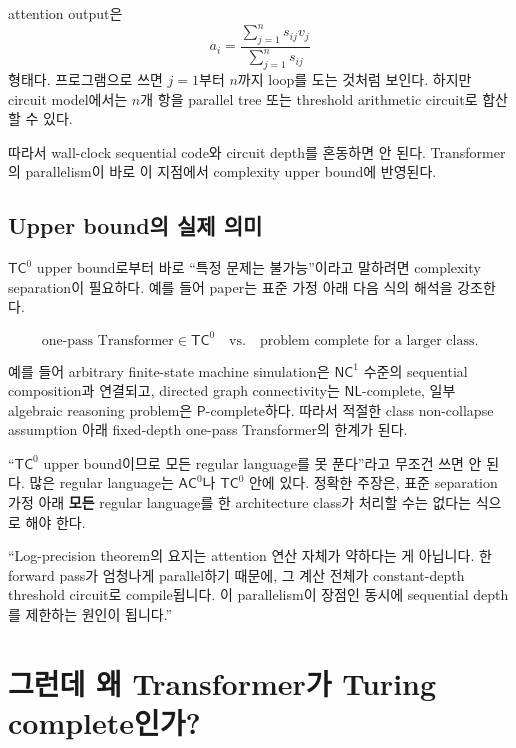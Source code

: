 \documentclass[11pt,a4paper,oneside,openany]{memoir}
\theoremstyle{definition}
\newcommand{\AC}{\mathsf{AC}}
\newcommand{\TC}{\mathsf{TC}}
\newcommand{\NC}{\mathsf{NC}}
\newcommand{\NL}{\mathsf{NL}}
\newcommand{\Pclass}{\mathsf{P}}
\begin{document}
attention output은
\[
a_i=\frac{\sum_{j=1}^{n}s_{ij}v_j}{\sum_{j=1}^{n}s_{ij}}
\]
형태다. 프로그램으로 쓰면 $j=1$부터 $n$까지 loop를 도는 것처럼 보인다.
하지만 circuit model에서는 $n$개 항을 parallel tree 또는 threshold arithmetic circuit로 합산할 수 있다.

따라서 wall-clock sequential code와 circuit depth를 혼동하면 안 된다.
Transformer의 parallelism이 바로 이 지점에서 complexity upper bound에 반영된다.

\section{Upper bound의 실제 의미}

$\TC^0$ upper bound로부터 바로 ``특정 문제는 불가능''이라고 말하려면 complexity separation이 필요하다.
예를 들어 paper는 표준 가정 아래 다음 식의 해석을 강조한다.

\[
\text{one-pass Transformer}\in\TC^0
\quad\text{vs.}\quad
\text{problem complete for a larger class}.
\]

예를 들어 arbitrary finite-state machine simulation은 $\NC^1$ 수준의 sequential composition과 연결되고,
directed graph connectivity는 $\NL$-complete, 일부 algebraic reasoning problem은 $\Pclass$-complete하다.
따라서 적절한 class non-collapse assumption 아래 fixed-depth one-pass Transformer의 한계가 된다.

\begin{warningbox}
``$\TC^0$ upper bound이므로 모든 regular language를 못 푼다''라고 무조건 쓰면 안 된다. 많은 regular language는 $\AC^0$나 $\TC^0$ 안에 있다. 정확한 주장은, 표준 separation 가정 아래 \textbf{모든} regular language를 한 architecture class가 처리할 수는 없다는 식으로 해야 한다.
\end{warningbox}

\begin{presentbox}
``Log-precision theorem의 요지는 attention 연산 자체가 약하다는 게 아닙니다. 한 forward pass가 엄청나게 parallel하기 때문에, 그 계산 전체가 constant-depth threshold circuit로 compile됩니다. 이 parallelism이 장점인 동시에 sequential depth를 제한하는 원인이 됩니다.''
\end{presentbox}

\chapter{그런데 왜 Transformer가 Turing complete인가?}
\end{document}

